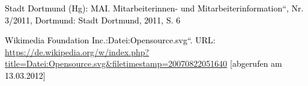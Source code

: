 \documentclass[a4paper]{article}
\newcommand\textstyleInternetlink[1]{\foreignlanguage{english}{\textcolor[rgb]{0.0,0.0,0.5019608}{#1}}}
\begin{document}
{
\textstyleInternetlink{\foreignlanguage{ngerman}{\textcolor{black}{Stadt}}}\textstyleInternetlink{\foreignlanguage{ngerman}{\textcolor{black}{
}}}\textstyleInternetlink{\foreignlanguage{ngerman}{\textcolor{black}{Dortmund}}}\textstyleInternetlink{\foreignlanguage{ngerman}{\textcolor{black}{
}}}\textstyleInternetlink{\foreignlanguage{ngerman}{\textcolor{black}{(Hg):}}}\textstyleInternetlink{\foreignlanguage{ngerman}{\textcolor{black}{
}}}\textstyleInternetlink{\textcolor{black}{{\quotedblbase}}}\textstyleInternetlink{\textcolor{black}{MAI}}\textstyleInternetlink{\foreignlanguage{ngerman}{\textcolor{black}{.}}}\textstyleInternetlink{\foreignlanguage{ngerman}{\textcolor{black}{
}}}\textstyleInternetlink{\textcolor{black}{Mitarbeiterinnen-}}\textstyleInternetlink{\textcolor{black}{
}}\textstyleInternetlink{\textcolor{black}{und}}\textstyleInternetlink{\textcolor{black}{
}}\textstyleInternetlink{\textcolor{black}{Mitarbeiterinformation}}\textstyleInternetlink{\foreignlanguage{ngerman}{\textcolor{black}{{\textquotedblleft}}}}\textstyleInternetlink{\textcolor{black}{,}}\textstyleInternetlink{\textcolor{black}{
}}\textstyleInternetlink{\textcolor{black}{Nr.}}\textstyleInternetlink{\textcolor{black}{
}}\textstyleInternetlink{\textcolor{black}{3}}\textstyleInternetlink{\foreignlanguage{ngerman}{\textcolor{black}{/2011}}}\textstyleInternetlink{\textcolor{black}{,}}\textstyleInternetlink{\textcolor{black}{
}}\textstyleInternetlink{\foreignlanguage{ngerman}{\textcolor{black}{Dortmund:
Stadt Dortmund,
}}}\textstyleInternetlink{\textcolor{black}{2011,}}\textstyleInternetlink{\textcolor{black}{
}}\textstyleInternetlink{\textcolor{black}{S.}}\textstyleInternetlink{\textcolor{black}{
}}\textstyleInternetlink{\foreignlanguage{ngerman}{\textcolor{black}{6}}}}


\bigskip

{
\textstyleInternetlink{\textcolor{black}{Wikimedia}}\textstyleInternetlink{\textcolor{black}{
}}\textstyleInternetlink{\textcolor{black}{Foundation}}\textstyleInternetlink{\textcolor{black}{
}}\textstyleInternetlink{\textcolor{black}{Inc.:}}\textstyleInternetlink{\textcolor{black}{
{\quotedblbase}}}\textstyleInternetlink{\textcolor{black}{Datei:Opensource.svg}}\textstyleInternetlink{\textcolor{black}{{\textquotedblleft}}}\textstyleInternetlink{\textcolor{black}{.}}\textstyleInternetlink{\textcolor{black}{
}}\textstyleInternetlink{\textcolor{black}{URL:}}\textstyleInternetlink{\textcolor{black}{
}}\url{https://de.wikipedia.org/w/index.php?title=Datei:Opensource.svg&filetimestamp=20070822051640}\textstyleInternetlink{\textcolor{black}{
}}\textcolor{black}{[abgerufen}\textcolor{black}{
}\textcolor{black}{am}\textcolor{black}{
}\textcolor{black}{13.03.2012]}}
\end{document}
